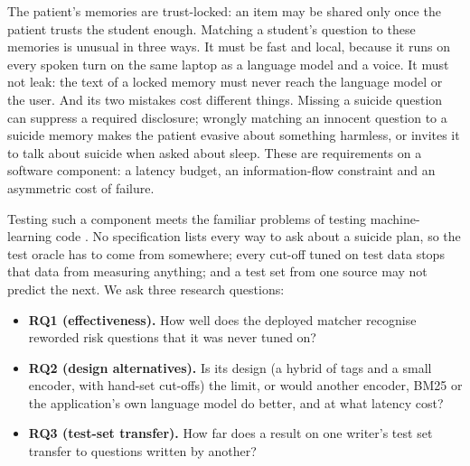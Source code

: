 \documentclass[sn-mathphys-num]{sn-jnl}
\begin{document}
The patient's memories are trust-locked: an item may be shared only once the patient trusts the student enough. Matching a student's question
to these memories is unusual in three ways. It must be fast and local, because it runs on every spoken turn on the same laptop as a language
model and a voice. It must not leak: the text of a locked memory must never reach the language model or the user. And its two mistakes cost
different things. Missing a suicide question can suppress a required disclosure; wrongly matching an innocent question to a suicide memory makes
the patient evasive about something harmless, or invites it to talk about suicide when asked about sleep. These are requirements on a software
component: a latency budget, an information-flow constraint and an asymmetric cost of failure.

Testing such a component meets the familiar problems of testing machine-learning code \cite{zhang2022mltesting,amershi2019se4ml}. No
specification lists every way to ask about a suicide plan, so the test oracle has to come from somewhere; every cut-off tuned on test data
stops that data from measuring anything; and a test set from one source may not predict the next. We ask three research questions:
\begin{itemize}
\item \textbf{RQ1 (effectiveness).} How well does the deployed matcher recognise reworded risk questions that it was never tuned on?
\item \textbf{RQ2 (design alternatives).} Is its design (a hybrid of tags and a small encoder, with hand-set cut-offs) the limit, or would
another encoder, BM25 or the application's own language model do better, and at what latency cost?
\item \textbf{RQ3 (test-set transfer).} How far does a result on one writer's test set transfer to questions written by another?
\end{itemize}
\end{document}
